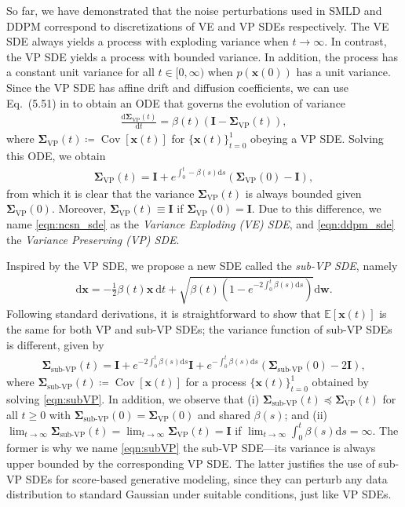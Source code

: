 \documentclass{article} \usepackage{iclr2021_conference,times}
\newcommand{\mbf}[1]{\mathbf{#1}}
\newcommand{\mbb}[1]{\mathbb{#1}}
\newcommand{\ud}{\mathrm{d}}
\newcommand{\bfx}{\mathbf{x}}
\newcommand{\bfw}{\mathbf{w}}
\newcommand{\bfI}{\mathbf{I}}
\newcommand{\bfsigma}{\mbf{\Sigma}}
\begin{document}
So far, we have demonstrated that the noise perturbations used in SMLD and DDPM correspond to discretizations of VE and VP SDEs respectively. The VE SDE always yields a process with exploding variance when $t \to \infty$. In contrast, the VP SDE yields a process with bounded variance. In addition, the process has a constant unit variance for all $t \in [0, \infty)$ when $p(\bfx(0))$ has a unit variance. Since the VP SDE has affine drift and diffusion coefficients, we can use Eq.~(5.51) in \citet{sarkka2019applied} to obtain an ODE that governs the evolution of variance
\begin{align*}
    \frac{\ud \bfsigma_\text{VP}(t)}{\ud t} = \beta(t) (\bfI - \bfsigma_\text{VP}(t)),
\end{align*}
where $\bfsigma_\text{VP}(t) \coloneqq \operatorname{Cov}[\bfx(t)]$ for $\{\bfx(t)\}_{t=0}^1$ obeying a VP SDE. Solving this ODE, we obtain
\begin{align}
    \bfsigma_\text{VP}(t) = \bfI + e^{\int_0^t - \beta(s) \ud s}(\bfsigma_\text{VP}(0) - \bfI),
\end{align}
from which it is clear that the variance $\bfsigma_\text{VP}(t)$ is always bounded given $\bfsigma_\text{VP}(0)$. Moreover, $\bfsigma_\text{VP}(t) \equiv \bfI$ if $\bfsigma_\text{VP}(0) = \bfI$. Due to this difference, we name \cref{eqn:ncsn_sde} as the \emph{Variance Exploding (VE) SDE}, and \cref{eqn:ddpm_sde} the \emph{Variance Preserving (VP) SDE}.

Inspired by the VP SDE, we propose a new SDE called the \emph{sub-VP SDE}, namely
\begin{align}
    \ud \bfx = -\frac{1}{2}\beta(t) \bfx~ \ud t + \sqrt{\beta(t)(1 - e^{-2\int_0^t \beta(s)\ud s})} \ud \bfw.\label{eqn:subVP}
\end{align}
Following standard derivations, it is straightforward to show that $\mbb{E}[\bfx(t)]$ is the same for both VP and sub-VP SDEs; the variance function of sub-VP SDEs is different, given by
\begin{align}
    \bfsigma_\text{sub-VP}(t) = \bfI + e^{-2 \int_{0}^t \beta(s)\ud s} \bfI + e^{-\int_0^t \beta(s) \ud s}(\bfsigma_\text{sub-VP}(0) - 2\bfI),
\end{align}
where $\bfsigma_\text{sub-VP}(t) \coloneqq \operatorname{Cov}[\bfx(t)]$ for a process $\{\bfx(t)\}_{t=0}^1$ obtained by solving \cref{eqn:subVP}. In addition, we observe that (i) $\bfsigma_{\text{sub-VP}}(t) \preccurlyeq \bfsigma_{\text{VP}}(t)$ for all $t \geq 0$ with $\bfsigma_\text{sub-VP}(0) = \bfsigma_\text{VP}(0)$ and shared $\beta(s)$; and (ii) $\lim_{t\to \infty} \bfsigma_{\text{sub-VP}}(t) = \lim_{t \to \infty}\bfsigma_{\text{VP}}(t) = \bfI$ if $\lim_{t\to \infty}\int_0^t \beta(s) \ud s = \infty$. The former is why we name \cref{eqn:subVP} the sub-VP SDE---its variance is always upper bounded by the corresponding VP SDE. The latter justifies the use of sub-VP SDEs for score-based generative modeling, since they can perturb any data distribution to standard Gaussian under suitable conditions, just like VP SDEs.
\end{document}
